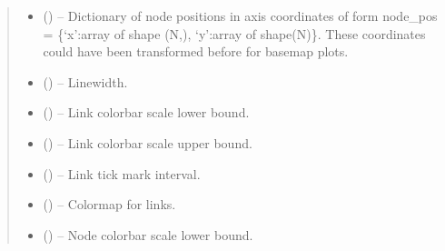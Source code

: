\documentclass[letterpaper,10pt,english]{sphinxmanual}
\begin{document}
\begin{fulllineitems}
\begin{quote}
\begin{description}
\begin{itemize}
\item {} 
 (\sphinxstyleliteralemphasis{, }\sphinxstyleliteralemphasis{ (}\sphinxstyleliteralemphasis{)}\sphinxstyleliteralemphasis{}) -- Dictionary of node positions in axis coordinates of form
node\_pos = \{`x':array of shape (N,), `y':array of shape(N)\}. These
coordinates could have been transformed before for basemap plots.

\item {} 
 (\sphinxstyleliteralemphasis{, }\sphinxstyleliteralemphasis{ (}\sphinxstyleliteralemphasis{)}\sphinxstyleliteralemphasis{}) -- Linewidth.

\item {} 
 (\sphinxstyleliteralemphasis{, }\sphinxstyleliteralemphasis{ (}\sphinxstyleliteralemphasis{)}\sphinxstyleliteralemphasis{}) -- Link colorbar scale lower bound.

\item {} 
 (\sphinxstyleliteralemphasis{, }\sphinxstyleliteralemphasis{ (}\sphinxstyleliteralemphasis{)}\sphinxstyleliteralemphasis{}) -- Link colorbar scale upper bound.

\item {} 
 (\sphinxstyleliteralemphasis{, }\sphinxstyleliteralemphasis{ (}\sphinxstyleliteralemphasis{)}\sphinxstyleliteralemphasis{}) -- Link tick mark interval.

\item {} 
 (\sphinxstyleliteralemphasis{, }\sphinxstyleliteralemphasis{ (}\sphinxstyleliteralemphasis{)}\sphinxstyleliteralemphasis{}) -- Colormap for links.

\item {} 
 (\sphinxstyleliteralemphasis{, }\sphinxstyleliteralemphasis{ (}\sphinxstyleliteralemphasis{)}\sphinxstyleliteralemphasis{}) -- Node colorbar scale lower bound.


\end{itemize}
\end{description}
\end{quote}
\end{fulllineitems}
\end{document}
